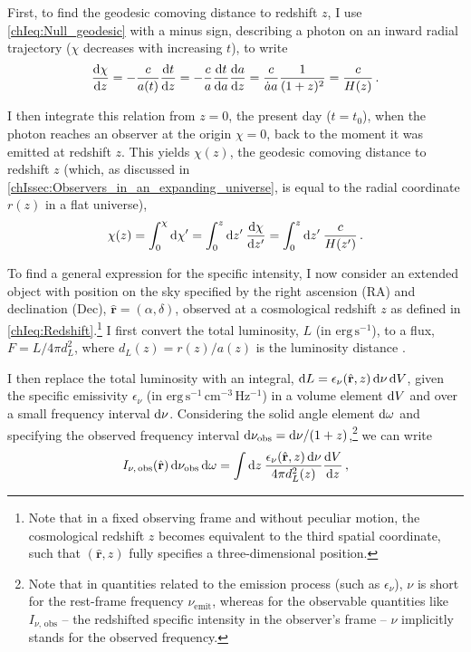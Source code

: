 First, to find the geodesic comoving distance to redshift $z$, I use \cref{chIeq:Null_geodesic} with a minus sign, describing a photon on an inward radial trajectory ($\chi$ decreases with increasing $t$), to write
\begin{equation}
    \label{chIeq:Null_geodesic_redshift}
    \frac{\dif \chi}{\dif z} = - \frac{c}{a(t)} \frac{\dif t}{\dif z} = - \frac{c}{a} \frac{\dif t}{\dif a} \frac{\dif a}{\dif z} = \frac{c}{\dot{a} a} \frac{1}{(1+z)^2} = \frac{c}{H(z)} \, .
\end{equation}

I then integrate this relation from $z = 0$, the present day ($t = t_0$), when the photon reaches an observer at the origin $\chi = 0$, back to the moment it was emitted at redshift $z$. This yields $\chi (z)$, the geodesic comoving distance to redshift $z$ (which, as discussed in \cref{chIssec:Observers_in_an_expanding_universe}, is equal to the radial coordinate $r (z)$ in a flat universe),
\begin{equation}
    \label{chIeq:Comoving_distance}
    \chi(z) = \int_0^\chi \dif \chi' = \int_0^z \dif z' \: \frac{\dif \chi}{\dif z'} = \int_0^z \dif z' \: \frac{c}{H(z')} \, .
\end{equation}

To find a general expression for the specific intensity, I now consider an extended object with position on the sky specified by the right ascension (RA) and declination (Dec), $\hat{\mathbf{r}} = (\alpha, \delta)$, observed at a cosmological redshift $z$ as defined in \cref{chIeq:Redshift}.\footnote{Note that in a fixed observing frame and without peculiar motion, the cosmological redshift $z$ becomes equivalent to the third spatial coordinate, such that $(\hat{\mathbf{r}}, z)$ fully specifies a three-dimensional position.} I first convert the total luminosity, $L$ (in $\mathrm{erg \, s^{-1}}$), to a flux, $F = L / 4 \pi d_L^2$, where $d_L(z) = r(z) / a(z)$ is the luminosity distance \citep[e.g.][]{1999astro.ph..5116H}.

I then replace the total luminosity with an integral, $\dif L = \epsilon_\nu (\hat{\mathbf{r}}, z) \dif \nu \dif V$, given the specific emissivity $\epsilon_\nu$ (in $\mathrm{erg \, s^{-1} \, cm^{-3} \, Hz^{-1}}$) in a volume element $\dif V$ and over a small frequency interval $\dif \nu$. Considering the solid angle element $\dif \omega$ and specifying the observed frequency interval $\dif \nu_\text{obs} = \dif \nu / (1+z)$,\footnote{Note that in quantities related to the emission process (such as $\epsilon_\nu$), $\nu$ is short for the rest-frame frequency $\nu_\text{emit}$, whereas for the observable quantities like $I_{\nu, \, \text{obs}}$ -- the redshifted specific intensity in the observer's frame -- $\nu$ implicitly stands for the observed frequency.} we can write
\begin{equation}
    \label{chIeq:Specific_intensity_integral1}
    I_{\nu, \, \text{obs}} (\hat{\mathbf{r}}) \dif \nu_\text{obs} \dif \omega = \int \dif z \: \frac{\epsilon_\nu (\hat{\mathbf{r}}, z) \dif \nu}{4 \pi d_L^2(z)} \frac{\dif V}{\dif z} \, ,
\end{equation}

